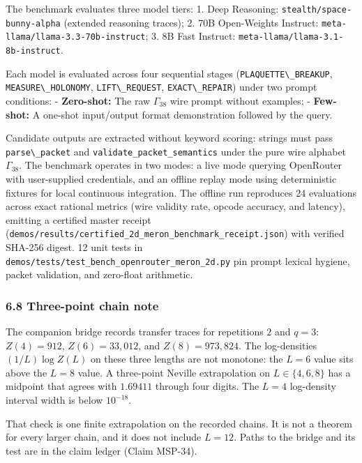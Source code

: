 \documentclass[
  11pt,
]{article}
\newcommand{\passthrough}[1]{#1}
\begin{document}
The benchmark evaluates three model tiers: 1. Deep Reasoning:
\nolinkurl{stealth/space-bunny-alpha} (extended reasoning traces); 2.
70B Open-Weights Instruct:
\nolinkurl{meta-llama/llama-3.3-70b-instruct}; 3. 8B Fast Instruct:
\nolinkurl{meta-llama/llama-3.1-8b-instruct}.

Each model is evaluated across four sequential stages
(\passthrough{\lstinline!PLAQUETTE\_BREAKUP!},
\passthrough{\lstinline!MEASURE\_HOLONOMY!},
\passthrough{\lstinline!LIFT\_REQUEST!},
\passthrough{\lstinline!EXACT\_REPAIR!}) under two prompt conditions: -
\textbf{Zero-shot:} The raw \(\Gamma_{38}\) wire prompt without
examples; - \textbf{Few-shot:} A one-shot input/output format
demonstration followed by the query.

Candidate outputs are extracted without keyword scoring: strings must
pass \passthrough{\lstinline!parse\_packet!} and
\nolinkurl{validate_packet_semantics} under the pure wire alphabet
\(\Gamma_{38}\). The benchmark operates in two modes: a live mode
querying OpenRouter with user-supplied credentials, and an offline
replay mode using deterministic fixtures for local continuous
integration. The offline run reproduces 24 evaluations across exact
rational metrics (wire validity rate, opcode accuracy, and latency),
emitting a certified master receipt
(\nolinkurl{demos/results/certified_2d_meron_benchmark_receipt.json})
with verified SHA-256 digest. 12 unit tests in
\nolinkurl{demos/tests/test_bench_openrouter_meron_2d.py} pin prompt
lexical hygiene, packet validation, and zero-float arithmetic.

\subsubsection{6.8 Three-point chain note}\label{three-point-chain-note}

The companion bridge records transfer traces for repetitions \(2\) and
\(q = 3\): \(Z(4) = 912\), \(Z(6) = 33{,}012\), and
\(Z(8) = 973{,}824\). The log-densities \((1/L)\log Z(L)\) on these
three lengths are not monotone: the \(L = 6\) value sits above the
\(L = 8\) value. A three-point Neville extrapolation on
\(L \in \{4, 6, 8\}\) has a midpoint that agrees with \(1.69411\)
through four digits. The \(L = 4\) log-density interval width is below
\(10^{-18}\).

That check is one finite extrapolation on the recorded chains. It is not
a theorem for every larger chain, and it does not include \(L = 12\).
Paths to the bridge and its test are in the claim ledger (Claim MSP-34).
\end{document}

